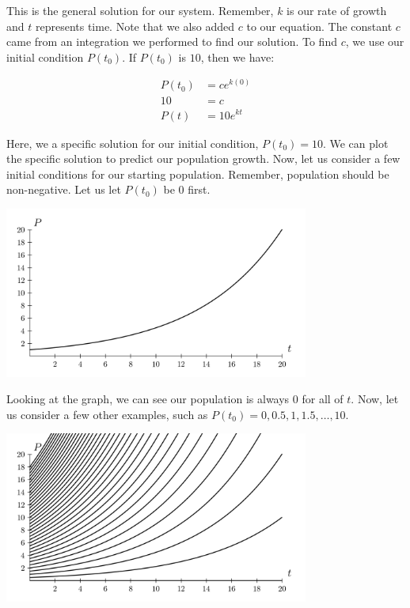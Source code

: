 \documentclass{amsart}
\theoremstyle{definition}
\numberwithin{equation}{section}
\begin{document}
\begin{sansmath}
This is the general solution for our system. Remember, $k$ is our rate of growth and $t$ represents time. Note that we also added $c$ to our equation. The constant $c$ came from an integration we performed to find our solution. To find $c$, we use our initial condition $P(t_0)$. If $P(t_0)$ is $10$, then we have:

\begin{align*}
  P(t_0) & = ce^{k(0)}\\
  10 & = c\\
  P(t) & = 10e^{kt}
\end{align*}

Here, we a specific solution for our initial condition, $P(t_0) = 10$. We can plot the specific solution to predict our population growth. Now, let us consider a few initial conditions for our starting population. Remember, population should be non-negative. Let us let $P(t_0)$ be $0$ first.
\begin{center}
  \includegraphics[width=10cm]{ExponentialGrowthSingle}
\end{center}

Looking at the graph, we can see our population is always $0$ for all of $t$. Now, let us consider a few other examples, such as $P(t_0) = 0, 0.5, 1, 1.5, \ldots, 10$.

\begin{center}
  \includegraphics[width=10cm]{ExponentialGrowGroup}
\end{center}


\end{sansmath}
\end{document}

